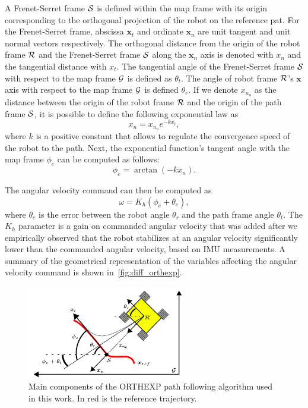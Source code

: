 A Frenet-Serret frame $\mathcal{S}$ is defined within the map frame with its origin corresponding to the orthogonal projection of the robot on the reference pat.
For the Frenet-Serret frame, abscissa $\bm x_t$ and ordinate $\bm x_n$ are unit tangent and unit normal vectors respectively.
The orthogonal distance from the origin of the robot frame $\mathcal{R}$ and the Frenet-Serret frame $\mathcal{S}$ along the $\bm x_n$ axis is denoted with $x_n$ and the tangential distance with $x_t$.
The tangential angle of the Frenet-Serret frame $\mathcal{S}$ with respect to the map frame $\mathcal{G}$ is defined as $\theta_t$.
The angle of robot frame $\mathcal{R}$'s $\bm x$ axis with respect to the map frame $\mathcal{G}$ is defined $\theta_r$. %
If we denote $x_{n_o}$ as the distance between the origin of the robot frame $\mathcal{R}$ and the origin of the path frame $\mathcal{S}$, it is possible to define the following exponential law as
\begin{equation}
	\label{eq:exp_law}
	x_n = x_{n_o} e^{-k x_t},
\end{equation}
where $k$ is a positive constant that allows to regulate the convergence speed of the robot to the path.
Next, the exponential function's tangent angle with the map frame $\phi_e$ can be computed as follows:
\begin{equation}
	\label{eq:exp_angle}
	\phi_e = \arctan(-k x_n).
\end{equation}

The angular velocity command can then be computed as %
\begin{equation}
	\label{eq:exp_PD}
	\omega = K_h (\phi_e + \theta_e),
\end{equation}
where $\theta_e$ is the error between the robot angle $\theta_r$ and the path frame angle $\theta_t$.
The $K_h$ parameter is a gain on commanded angular velocity that was added after we empirically observed that the robot stabilizes at an angular velocity significantly lower than the commanded angular velocity, based on \ac{IMU} measurements.
A summary of the geometrical representation of the variables affecting the angular velocity command is shown in~\autoref{fig:diff_orthexp}.

\begin{figure}
	\centering
	\includegraphics[height=1.6in]{figs/path_follower/orthexp.pdf}
	\caption{Main components of the \ac{ORTHEXP} path following algorithm used in this work.
		In red is the reference trajectory.}
	\label{fig:diff_orthexp}
\end{figure}


